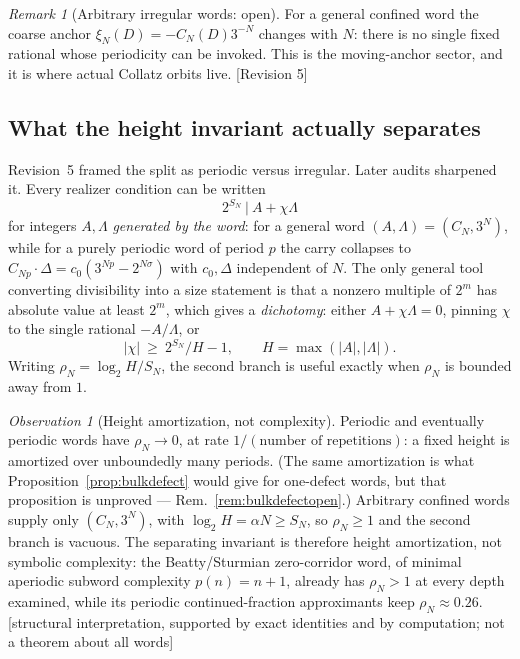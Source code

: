 \documentclass[11pt]{article}
\theoremstyle{plain}
\theoremstyle{definition}
\theoremstyle{remark}
\newtheorem{remark}[theorem]{Remark}
\newtheorem{observation}[theorem]{Observation}
\newcommand{\al}{\alpha}
\newcommand{\status}[1]{\textsf{\footnotesize[#1]}}
\begin{document}
\begin{remark}[Arbitrary irregular words: open]\label{rem:moving}
For a general confined word the coarse anchor $\xi_N(D)=-C_N(D)3^{-N}$ changes with $N$: there is
no single fixed rational whose periodicity can be invoked. This is the moving-anchor sector, and it
is where actual Collatz orbits live. \status{Revision 5}
\end{remark}

\subsection{What the height invariant actually separates}\label{sec:height}

Revision~5 framed the split as periodic versus irregular. Later audits sharpened it. Every realizer
condition can be written
\[
2^{S_N}\ \big|\ A+\chi\Lambda
\]
for integers $A,\Lambda$ \emph{generated by the word}: for a general word $(A,\Lambda)=(C_N,3^N)$,
while for a purely periodic word of period $p$ the carry collapses to
$C_{Np}\cdot\Delta=c_0(3^{Np}-2^{N\sigma})$ with $c_0,\Delta$ independent of $N$. The only general
tool converting divisibility into a size statement is that a nonzero multiple of $2^m$ has absolute
value at least $2^m$, which gives a \emph{dichotomy}: either $A+\chi\Lambda=0$, pinning $\chi$ to
the single rational $-A/\Lambda$, or
\[
|\chi|\ \ge\ 2^{S_N}/H-1,\qquad H=\max(|A|,|\Lambda|).
\]
Writing $\rho_N=\log_2 H/S_N$, the second branch is useful exactly when $\rho_N$ is bounded away
from $1$.

\begin{observation}[Height amortization, not complexity]\label{obs:height}
Periodic and eventually periodic words have $\rho_N\to0$, at rate $1/(\text{number of
repetitions})$: a fixed height is amortized over unboundedly many periods. (The same amortization
is what Proposition~\ref{prop:bulkdefect} would give for one-defect words, but that proposition is
unproved --- Rem.~\ref{rem:bulkdefectopen}.) Arbitrary confined words
supply only $(C_N,3^N)$, with $\log_2 H=\al N\ge S_N$, so $\rho_N\ge1$ and the second branch is
vacuous. The separating invariant is therefore height amortization, not symbolic complexity: the
Beatty/Sturmian zero-corridor word, of minimal aperiodic subword complexity $p(n)=n+1$, already has
$\rho_N>1$ at every depth examined, while its periodic continued-fraction approximants keep
$\rho_N\approx0.26$. \status{structural interpretation, supported by exact identities and by
computation; not a theorem about all words}
\end{observation}
\end{document}
